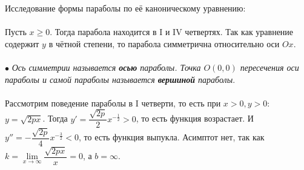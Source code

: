 Исследование формы параболы по её каноническому уравнению:\\\\
Пусть $x \geqslant 0$. Тогда парабола находится в I и IV четвертях. Так как уравнение содержит $y$ в чётной степени, то парабола симметрична относительно оси $Ox$.\\\\
$\bullet$ \textit{Ось симметрии называется \textbf{осью} параболы. Точка $O(0,0)$ пересечения оси параболы и самой параболы называется \textbf{вершиной} параболы}.\\\\
Рассмотрим поведение параболы в I четверти, то есть при $x > 0, y> 0$:\\
$y = \sqrt{2px}$. Тогда $y' = \dfrac{\sqrt{2p}}{2}x^{-\frac{1}{2}}>0$, то есть функция возрастает. И $y'' = -\dfrac{\sqrt{2p}}{4}x^{-\frac{3}{2}}<0$, то есть функция выпукла. Асимптот нет, так как $k = \lim\limits_{x\to\infty} \dfrac{\sqrt{2px}}{x} = 0$, а $b = \infty$.

